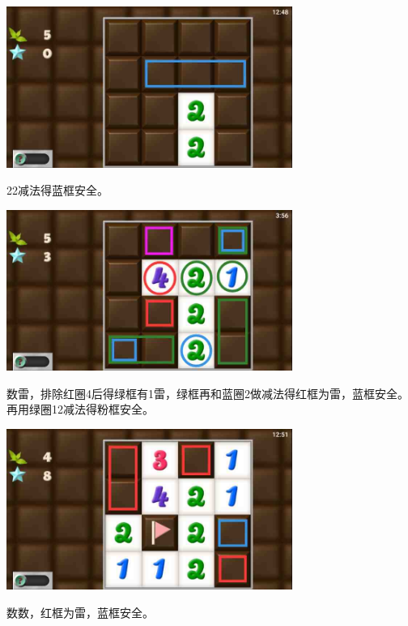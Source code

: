\subsection{} %
\begin{center}
    \includegraphics[width=0.7\textwidth]{puzzlelow/136-1.jpg}
\end{center}
22减法得蓝框安全。
\begin{center}
    \includegraphics[width=0.7\textwidth]{puzzlelow/136-2.jpg}
\end{center}
数雷，排除红圈4后得绿框有1雷，绿框再和蓝圈2做减法得红框为雷，蓝框安全。再用绿圈12减法得粉框安全。
\begin{center}
    \includegraphics[width=0.7\textwidth]{puzzlelow/136-3.jpg}
\end{center}
数数，红框为雷，蓝框安全。

